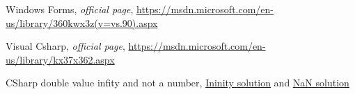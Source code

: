 \begin{thebibliography}{99999}
\singlespace\normalsize

 Windows Forms, \textit{ official page}, \url{https://msdn.microsoft.com/en-us/library/360kwx3z(v=vs.90).aspx}


 Visual Csharp, \textit{ official page}, \url{https://msdn.microsoft.com/en-us/library/kx37x362.aspx}

 CSharp double value infity and not a number, \href{https://msdn.microsoft.com/en-us/library/kx37x362.aspx}{Ininity solution} and \href{https://msdn.microsoft.com/en-us/library/system.double.isnan(v=vs.110).aspx}{NaN solution}


\end{thebibliography}
